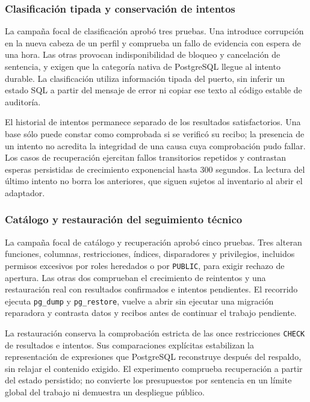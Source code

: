 \subsubsection{Clasificación tipada y conservación de intentos}

La campaña focal de clasificación aprobó tres pruebas. Una introduce corrupción en la nueva cabeza de un perfil y comprueba un fallo de evidencia con espera de una hora. Las otras provocan indisponibilidad de bloqueo y cancelación de sentencia, y exigen que la categoría nativa de PostgreSQL llegue al intento durable. La clasificación utiliza información tipada del puerto, sin inferir un estado SQL a partir del mensaje de error ni copiar ese texto al código estable de auditoría.

El historial de intentos permanece separado de los resultados satisfactorios. Una base sólo puede constar como comprobada si se verificó su recibo; la presencia de un intento no acredita la integridad de una causa cuya comprobación pudo fallar. Los casos de recuperación ejercitan fallos transitorios repetidos y contrastan esperas persistidas de crecimiento exponencial hasta 300 segundos. La lectura del último intento no borra los anteriores, que siguen sujetos al inventario al abrir el adaptador.

\subsubsection{Catálogo y restauración del seguimiento técnico}

La campaña focal de catálogo y recuperación aprobó cinco pruebas. Tres alteran funciones, columnas, restricciones, índices, disparadores y privilegios, incluidos permisos excesivos por roles heredados o por \texttt{PUBLIC}, para exigir rechazo de apertura. Las otras dos comprueban el crecimiento de reintentos y una restauración real con resultados confirmados e intentos pendientes. El recorrido ejecuta \texttt{pg\_dump} y \texttt{pg\_restore}, vuelve a abrir sin ejecutar una migración reparadora y contrasta datos y recibos antes de continuar el trabajo pendiente.

La restauración conserva la comprobación estricta de las once restricciones \texttt{CHECK} de resultados e intentos. Sus comparaciones explícitas estabilizan la representación de expresiones que PostgreSQL reconstruye después del respaldo, sin relajar el contenido exigido. El experimento comprueba recuperación a partir del estado persistido; no convierte los presupuestos por sentencia en un límite global del trabajo ni demuestra un despliegue público.

